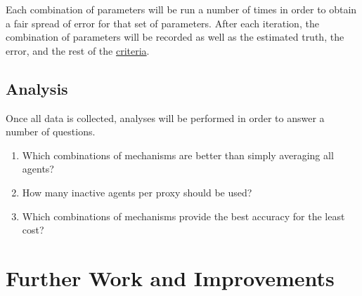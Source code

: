 Each combination of parameters will be run a number of times in order to obtain
a fair spread of error for that set of parameters.
After each iteration, the combination of parameters will be recorded as well
as the estimated truth, the error, and the rest of the
\hyperref[subsec:criteria]{criteria}.


\subsection{Analysis}\label{subsec:analysis}
Once all data is collected, analyses will be performed in order to answer a
number of questions.
\begin{enumerate}[label=\textbf{Q\arabic*}., leftmargin=2\parindent]
    \item Which combinations of mechanisms are better than simply averaging
    all agents?
    \item How many inactive agents per proxy should be used?
    \item Which combinations of mechanisms provide the best accuracy for the
    least cost?
\end{enumerate}


\section{Further Work and Improvements}\label{sec:further-work-and-improvements}

